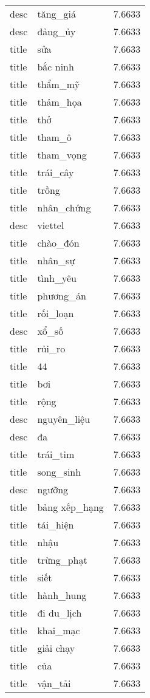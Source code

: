 \documentclass{article}
\begin{document}
\begin{tabular}{lll}
desc & tăng\_giá & 7.6633\\
desc & đảng\_ủy & 7.6633\\
title & sửa & 7.6633\\
title & bắc ninh & 7.6633\\
title & thẩm\_mỹ & 7.6633\\
title & thảm\_họa & 7.6633\\
title & thở & 7.6633\\
title & tham\_ô & 7.6633\\
title & tham\_vọng & 7.6633\\
title & trái\_cây & 7.6633\\
title & trồng & 7.6633\\
title & nhân\_chứng & 7.6633\\
desc & viettel & 7.6633\\
title & chào\_đón & 7.6633\\
title & nhân\_sự & 7.6633\\
title & tình\_yêu & 7.6633\\
title & phương\_án & 7.6633\\
title & rối\_loạn & 7.6633\\
desc & xổ\_số & 7.6633\\
title & rủi\_ro & 7.6633\\
title & 44 & 7.6633\\
title & bơi & 7.6633\\
title & rộng & 7.6633\\
desc & nguyên\_liệu & 7.6633\\
desc & đa & 7.6633\\
title & trái\_tim & 7.6633\\
title & song\_sinh & 7.6633\\
desc & ngưỡng & 7.6633\\
title & bảng xếp\_hạng & 7.6633\\
title & tái\_hiện & 7.6633\\
title & nhậu & 7.6633\\
title & trừng\_phạt & 7.6633\\
title & siết & 7.6633\\
title & hành\_hung & 7.6633\\
title & đi du\_lịch & 7.6633\\
title & khai\_mạc & 7.6633\\
title & giải chạy & 7.6633\\
title & của & 7.6633\\
title & vận\_tải & 7.6633\\

\end{tabular}
\end{document}
